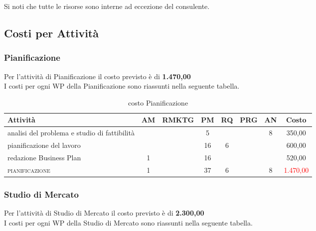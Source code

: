 Si noti che tutte le risorse sono interne ad eccezione del consulente. 

\subsection{Costi per Attività}

\subsubsection{Pianificazione}
Per l'attività di Pianificazione il costo previsto è di \textbf{ \text{\euro}1.470,00 }\\	
I costi per ogni WP della Pianificazione sono riassunti nella seguente tabella.
\begin{table}[!h]
\footnotesize
\centering
\begin{tabular}{|p{}|c|c|c|c|c|c|c|}
\hline
\textbf{Attività}& \textbf{AM} & \textbf{RMKTG} & \textbf{PM} & \textbf{RQ} & \textbf{PRG} & \textbf{AN} & \textbf{Costo}  \\
\hline
analisi del problema e studio di fattibilità  & & & 5& & & 8& \text{\euro} 350,00\\
pianificazione del lavoro	 				  & & &	16&	6& & & \text{\euro} 600,00 \\	
redazione Business Plan						& 1 & &16& & & &  	\text{\euro} 520,00 \\			  
\hline
\scshape{}pianificazione   							& 1 & &37 &	6 &	&	8 &	\textcolor{red}{ \text{\euro}1.470,00 }\\		 
\hline
\end{tabular}
\caption{costo Pianificazione}\label{tab:pianificazione}
\end{table}

\subsubsection{Studio di Mercato}

Per l'attività di Studio di Mercato il costo previsto è di \textbf{ \text{\euro}2.300,00 }\\	
I costi per ogni WP della Studio di Mercato sono riassunti nella seguente tabella.

